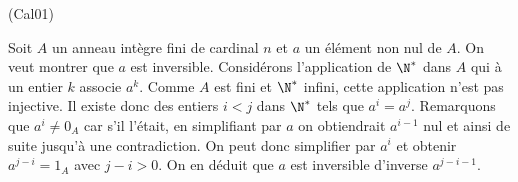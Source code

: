 \begin{tiny}(Cal01)\end{tiny} Soit $A$ un anneau intègre fini de cardinal $n$ et $a$ un élément non nul de $A$. On veut montrer que $a$ est inversible. Considérons l'application de $\N^*$ dans $A$ qui à un entier $k$ associe $a^k$. Comme $A$ est fini et $\N^*$ infini, cette application n'est pas injective. Il existe donc des entiers $i<j$ dans $\N^*$ tels que $a^i = a^j$.\newline
Remarquons que $a^i\neq 0_A$ car s'il l'était, en simplifiant par $a$ on obtiendrait $a^{i-1}$ nul et ainsi de suite jusqu'à une contradiction. On peut donc simplifier par $a^i$ et obtenir
$a^{j-i}=1_A$ avec $j-i>0$. On en déduit que $a$ est inversible d'inverse $a^{j-i-1}$. 
